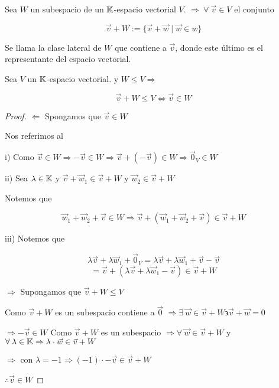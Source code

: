 \begin{definition}
    Sea $W$ un subespacio de un $\mathbb{K}$-espacio vectorial $V$. $\Rightarrow \: \forall \: \vec{v} \in V$ el conjunto

    \begin{equation*}
        \vec{v} + W := \{ \vec{v} + \vec{w} \mid \vec{w} \in w \}
    \end{equation*}

    Se llama la clase lateral de $W$ que contiene a $\vec{v}$, donde este último es el representante del espacio vectorial.
\end{definition}

\begin{theorem}
    Sea $V$ un $\mathbb{K}$-espacio vectorial. y $W \leq V \Rightarrow$

    \begin{equation*}
        \vec{v}+W \leq V \iff  \vec{v} \in W
    \end{equation*}
\end{theorem}

\begin{proof}
    $\Leftarrow$ Spongamos que $\vec{v} \in W$

    Nos referimos al 

    i) Como  $\vec{v} \in W \Rightarrow -\vec{v} \in W \Rightarrow  \vec{v}+ (-\vec{v}) \in W \Rightarrow {\vec{0}}_{V}  \in W$

    ii) Sea $\lambda \in \mathbb{K}$ y $\vec{v} + {\vec{w}}_{1} \in \vec{v}+W $ y ${\vec{w}}_{2} \in \vec{v}+W$

    Notemos que 

    \begin{equation*}
        {\vec{w}}_{1} + {\vec{w}}_{2} +  \vec{v} \in W \Rightarrow \vec{v} + ({\vec{w}}_{1} + {\vec{w}}_{2} +  \vec{v}) \in \vec{v} + W 
    \end{equation*}

    iii) Notemos que

    \begin{equation*}
        \lambda \vec{v} + \lambda {\vec{w}}_{1} +  {\vec{0}}_{V} = \lambda \vec{v} + \lambda {\vec{w}}_{1} + \vec{v} - \vec{v}
    \end{equation*}
    \begin{equation*}
        = \vec{v} + ( \lambda \vec{v} + \lambda {\vec{w}}_{1} - \vec{v}) \in \vec{v} + W
    \end{equation*}
        
    $\Rightarrow$ Supongamos que $\vec{v}+W \leq V$

    Como $\vec{v}+W$ es un subespacio contiene a $\vec{0}$ $\Rightarrow \exists  \: \vec{w} \in \vec{v}+W   \backepsilon \vec{v} + \vec{w} = 0$

    $\Rightarrow - \vec{v} \in W$ Como $\vec{v}+W$ es un subespacio $\Rightarrow \forall \: \vec{w} \in \vec{v}+W$ y $\forall \: \lambda \in \mathbb{K} \Rightarrow \lambda \cdot \vec{w} \in \vec{v}+W$

    $\Rightarrow$ con $\lambda = -1 \Rightarrow (-1) \cdot -\vec{v} \in \vec{v} + W$

    $\therefore \vec{v} \in W$
\end{proof}

